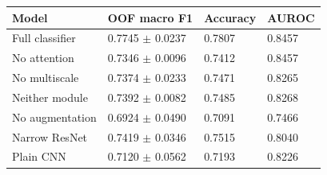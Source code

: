 \begin{tabular}{llll}
\toprule
Model & OOF macro F1 & Accuracy & AUROC \\
\midrule
Full classifier & 0.7745 $\pm$ 0.0237 & 0.7807 & 0.8457 \\
No attention & 0.7346 $\pm$ 0.0096 & 0.7412 & 0.8457 \\
No multiscale & 0.7374 $\pm$ 0.0233 & 0.7471 & 0.8265 \\
Neither module & 0.7392 $\pm$ 0.0082 & 0.7485 & 0.8268 \\
No augmentation & 0.6924 $\pm$ 0.0490 & 0.7091 & 0.7466 \\
Narrow ResNet & 0.7419 $\pm$ 0.0346 & 0.7515 & 0.8040 \\
Plain CNN & 0.7120 $\pm$ 0.0562 & 0.7193 & 0.8226 \\
\bottomrule
\end{tabular}
